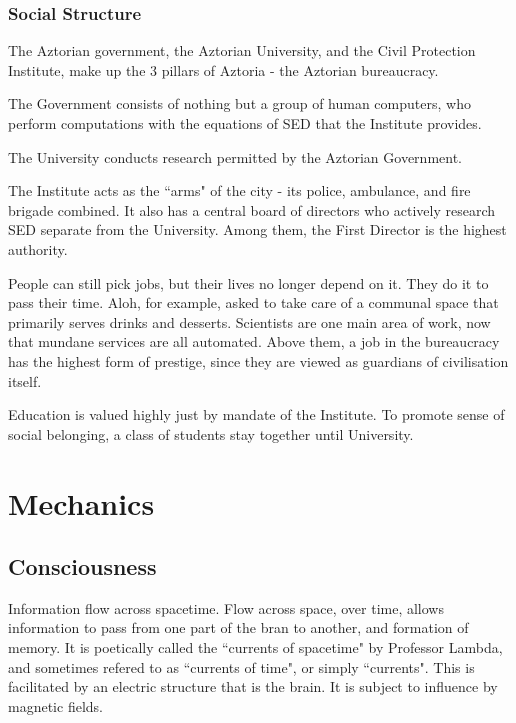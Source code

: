\documentclass[11pt]{article}
\begin{document}
		\subsubsection{Social Structure}
		The Aztorian government, the Aztorian University, and the Civil Protection Institute, make up the 3 pillars of Aztoria - the Aztorian bureaucracy.
		
		The Government consists of nothing but a group of human computers, who perform computations with the equations of SED that the Institute provides.
		
		The University conducts research permitted by the Aztorian Government.
		
		The Institute acts as the ``arms" of the city - its police, ambulance, and fire brigade combined.
		It also has a central board of directors who actively research SED separate from the University.
		Among them, the First Director is the highest authority.
		
		People can still pick jobs, but their lives no longer depend on it.
		They do it to pass their time. 
		Aloh, for example, asked to take care of a communal space that primarily serves drinks and desserts.
		Scientists are one main area of work, now that mundane services are all automated.
		Above them, a job in the bureaucracy has the highest form of prestige, since they are viewed as guardians of civilisation itself.
		
		Education is valued highly just by mandate of the Institute. 
		To promote sense of social belonging, a class of students stay together until University.

\newpage





\section{Mechanics}
	
	\subsection{Consciousness}
	Information flow across spacetime.
	Flow across space, over time, allows information to pass from one part of the bran to another, and formation of memory.
	It is poetically called the ``currents of spacetime" by Professor Lambda, and sometimes refered to as ``currents of time", or simply ``currents".
	This is facilitated by an electric structure that is the brain.
	It is subject to influence by magnetic fields.
\end{document}
